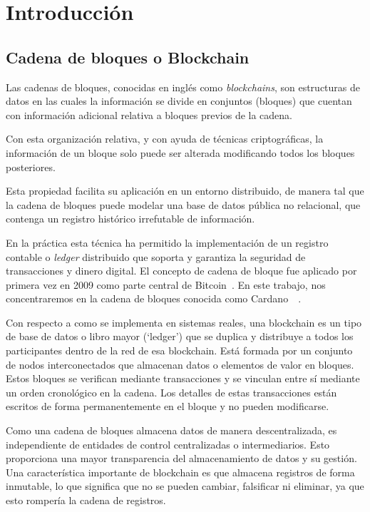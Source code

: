 \documentclass[12pt]{book}
\begin{document}

\chapter{Introducción}

\section{Cadena de bloques o Blockchain}
Las cadenas de bloques, conocidas en inglés como \textit{blockchains}, son estructuras de datos en las cuales la información se divide en conjuntos (bloques) que cuentan con información adicional relativa a bloques previos de la cadena.

Con esta organización relativa, y con ayuda de técnicas criptográficas, la información de un bloque solo puede ser alterada modificando todos los bloques posteriores.

Esta propiedad facilita su aplicación en un entorno distribuido, de manera tal que la cadena de bloques puede modelar una base de datos pública no relacional, que contenga un registro histórico irrefutable de información.

En la práctica esta técnica ha permitido la implementación de un registro contable o \textit{ledger} distribuido que soporta y garantiza la seguridad de transacciones y dinero digital.
El concepto de cadena de bloque fue aplicado por primera vez en 2009 como parte central de Bitcoin~\cite{nakamoto2008bitcoin}. En este trabajo, nos concentraremos en la cadena de bloques conocida como Cardano~\cite{cardano_website}~\cite{cardano_utxo_ledger}.

Con respecto a como se implementa en sistemas reales, una blockchain es un tipo de base de datos o libro mayor (`ledger') que se duplica y distribuye a todos los participantes dentro de la red de esa blockchain. Está formada por un conjunto de nodos interconectados que almacenan datos o elementos de valor en bloques. Estos bloques se verifican mediante transacciones y se vinculan entre sí mediante un orden cronológico en la cadena. Los detalles de estas transacciones están escritos de forma permanentemente en el bloque y no pueden modificarse.

Como una cadena de bloques almacena datos de manera descentralizada, es independiente de entidades de control centralizadas o intermediarios. Esto proporciona una mayor transparencia del almacenamiento de datos y su gestión. Una característica importante de blockchain es que almacena registros de forma inmutable, lo que significa que no se pueden cambiar, falsificar ni eliminar, ya que esto rompería la cadena de registros.
\end{document}
